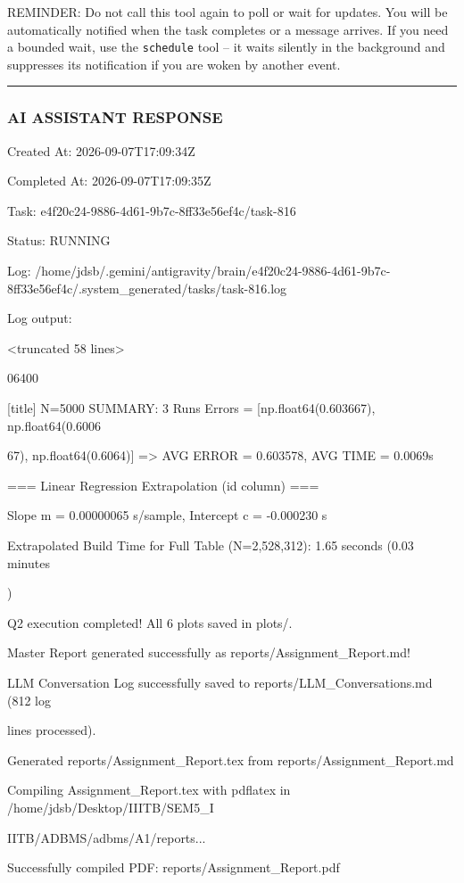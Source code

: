 \documentclass[11pt,a4paper]{article}
\begin{document}
REMINDER: Do not call this tool again to poll or wait for updates. You will be automatically notified when the task completes or a message arrives. If you need a bounded wait, use the \texttt{schedule} tool -- it waits silently in the background and suppresses its notification if you are woken by another event.


\hrule

\subsubsection{AI ASSISTANT RESPONSE}

Created At: 2026-09-07T17:09:34Z

Completed At: 2026-09-07T17:09:35Z

Task: e4f20c24-9886-4d61-9b7c-8ff33e56ef4c/task-816

Status: RUNNING

Log: /home/jdsb/.gemini/antigravity/brain/e4f20c24-9886-4d61-9b7c-8ff33e56ef4c/.system\_generated/tasks/task-816.log

Log output:

<truncated 58 lines>

06400

[title] N=5000 SUMMARY: 3 Runs Errors = [np.float64(0.603667), np.float64(0.6006

67), np.float64(0.6064)] => AVG ERROR = 0.603578, AVG TIME = 0.0069s

=== Linear Regression Extrapolation (id column) ===

Slope m = 0.00000065 s/sample, Intercept c = -0.000230 s

Extrapolated Build Time for Full Table (N=2,528,312): 1.65 seconds (0.03 minutes

)

Q2 execution completed! All 6 plots saved in plots/.

Master Report generated successfully as reports/Assignment\_Report.md!

LLM Conversation Log successfully saved to reports/LLM\_Conversations.md (812 log

lines processed).

Generated reports/Assignment\_Report.tex from reports/Assignment\_Report.md

Compiling Assignment\_Report.tex with pdflatex in /home/jdsb/Desktop/IIITB/SEM5\_I

IITB/ADBMS/adbms/A1/reports...

Successfully compiled PDF: reports/Assignment\_Report.pdf
\end{document}
